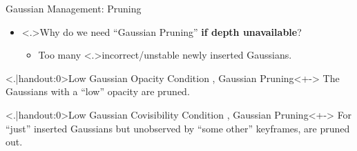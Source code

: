 \begin{Frame}{Gaussian Management: Pruning}
	\begin{itemize}
		\setlength{\itemsep}{1.5ex}
		\item<+-> \alert<.>{Why} do we need ``Gaussian Pruning'' \textbf{if depth unavailable}?
			\vspace*{1.5ex}
			\begin{itemize}
				\setlength{\itemsep}{1.5ex}
				\item<+-> Too many \alert<.>{incorrect/unstable} newly inserted Gaussians.
			\end{itemize}
	\end{itemize}
	\vspace*{\fill}
	\begin{block}{\alert<.|handout:0>{Low Gaussian Opacity} \hfill Condition , Gaussian Pruning}<+->
		The Gaussians with a ``low'' opacity are pruned.
	\end{block}
	\vspace*{\fill}
	\begin{block}{\alert<.|handout:0>{Low Gaussian Covisibility} \hfill Condition , Gaussian Pruning}<+->
		For ``just'' inserted Gaussians but unobserved by ``some other'' keyframes, are pruned out.
	\end{block}
\end{Frame}

